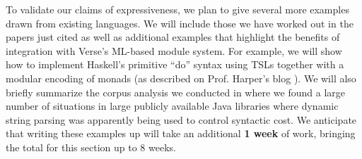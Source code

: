 To validate our claims of expressiveness, we plan to give several more examples drawn from existing languages. We will include those we have worked out in the papers just cited as well as additional examples that highlight the benefits of integration with Verse's ML-based module system. For example, we will show how to implement Haskell's primitive ``do'' syntax using TSLs together with a modular encoding of monads (as described on Prof. Harper's blog \cite{SML/Monads}). We will also briefly summarize the corpus analysis we conducted in \cite{TSLs} where we found a large number of  situations in large publicly available Java libraries where dynamic string parsing was apparently being used to control syntactic cost. We anticipate that writing these examples up will take an additional \textbf{1 week} of work, bringing the total for this section up to 8 weeks. %



